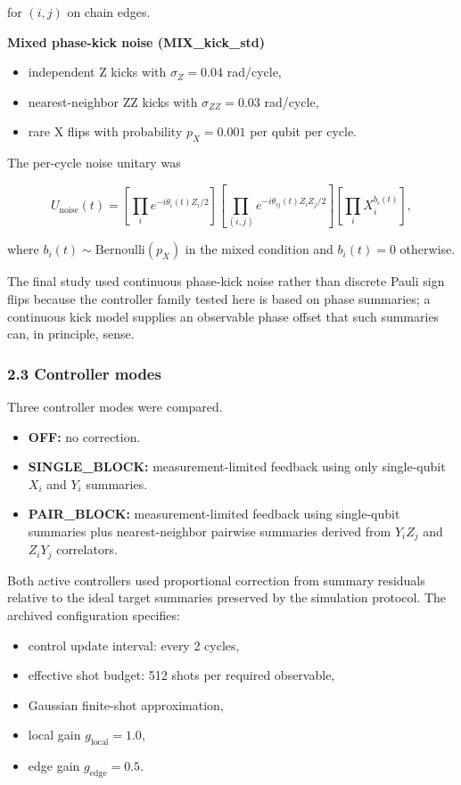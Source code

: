 \documentclass[
]{article}
\providecommand{\tightlist}{%
  \setlength{\itemsep}{0pt}\setlength{\parskip}{0pt}}
\begin{document}
for \((i,j)\) on chain edges.

\textbf{Mixed phase-kick noise (MIX\_kick\_std)}

\begin{itemize}
\tightlist
\item
  independent Z kicks with \(\sigma_Z = 0.04\) rad/cycle,
\item
  nearest-neighbor ZZ kicks with \(\sigma_{ZZ} = 0.03\) rad/cycle,
\item
  rare X flips with probability \(p_X = 0.001\) per qubit per cycle.
\end{itemize}

The per-cycle noise unitary was

\[
U_{\mathrm{noise}}(t) =
\left[ \prod_i e^{-i\theta_i(t) Z_i / 2} \right]
\left[ \prod_{(i,j)} e^{-i\theta_{ij}(t) Z_i Z_j / 2} \right]
\left[ \prod_i X_i^{b_i(t)} \right],
\]

where \(b_i(t) \sim \mathrm{Bernoulli}(p_X)\) in the mixed condition and
\(b_i(t)=0\) otherwise.

The final study used continuous phase-kick noise rather than discrete
Pauli sign flips because the controller family tested here is based on
phase summaries; a continuous kick model supplies an observable phase
offset that such summaries can, in principle, sense.

\subsubsection{2.3 Controller modes}\label{controller-modes}

Three controller modes were compared.

\begin{itemize}
\tightlist
\item
  \textbf{OFF:} no correction.
\item
  \textbf{SINGLE\_BLOCK:} measurement-limited feedback using only
  single-qubit \(X_i\) and \(Y_i\) summaries.
\item
  \textbf{PAIR\_BLOCK:} measurement-limited feedback using single-qubit
  summaries plus nearest-neighbor pairwise summaries derived from
  \(Y_i Z_j\) and \(Z_i Y_j\) correlators.
\end{itemize}

Both active controllers used proportional correction from summary
residuals relative to the ideal target summaries preserved by the
simulation protocol. The archived configuration specifies:

\begin{itemize}
\tightlist
\item
  control update interval: every 2 cycles,
\item
  effective shot budget: 512 shots per required observable,
\item
  Gaussian finite-shot approximation,
\item
  local gain \(g_{\mathrm{local}} = 1.0\),
\item
  edge gain \(g_{\mathrm{edge}} = 0.5\).
\end{itemize}
\end{document}

